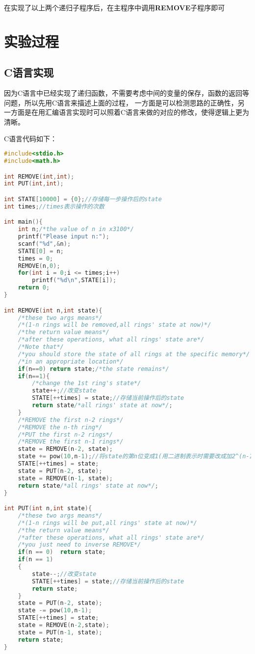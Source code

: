 \documentclass{article}
\begin{document}
在实现了以上两个递归子程序后，在主程序中调用{\bfseries REMOVE}子程序即可

\section{实验过程}

\subsection{C语言实现}

因为C语言中已经实现了递归函数，不需要考虑中间的变量的保存，函数的返回等问题，所以先用C语言来描述上面的过程，
一方面是可以检测思路的正确性，另一方面是在用汇编语言实现时可以照着C语言来做的对应的修改，使得逻辑上更为清晰。

C语言代码如下：

\begin{lstlisting}[language=C]
#include<stdio.h>
#include<math.h>

int REMOVE(int,int);
int PUT(int,int);

int STATE[10000] = {0};//存储每一步操作后的state
int times;//times表示操作的次数

int main(){
	int n;/*the value of n in x3100*/ 
	printf("Please input n:");
	scanf("%d",&n);
	STATE[0] = n;
	times = 0;
	REMOVE(n,0);
	for(int i = 0;i <= times;i++)
		printf("%d\n",STATE[i]);
	return 0;
}

int REMOVE(int n,int state){
	/*these two args means*/
	/*(1-n rings will be removed,all rings' state at now)*/
	/*the return value means*/
	/*after these operations, what all rings' state are*/
	/*Note that*/
	/*you should store the state of all rings at the specific memory*/
	/*in an appropriate location*/
	if(n==0) return state;/*the state remains*/
	if(n==1){
		/*change the 1st ring's state*/
		state++;//改变state
		STATE[++times] = state;//存储当前操作后的state
		return state/*all rings' state at now*/;
	}
	/*REMOVE the first n-2 rings*/
	/*REMOVE the n-th ring*/
	/*PUT the first n-2 rings*/
	/*REMOVE the first n-1 rings*/
	state = REMOVE(n-2, state);
	state += pow(10,n-1);//将state的第n位变成1(用二进制表示时需要改成加2^(n-1))
	STATE[++times] = state;
	state = PUT(n-2, state);
	state = REMOVE(n-1, state);
	return state/*all rings' state at now*/;
}

int PUT(int n,int state){
	/*these two args means*/
	/*(1-n rings will be put,all rings' state at now)*/
	/*the return value means*/
	/*after these operations, what all rings' state are*/
	/*you just need to inverse REMOVE*/
	if(n == 0)	return state;
	if(n == 1)
	{
		state--;//改变state
		STATE[++times] = state;//存储当前操作后的state
		return state;
	}
	state = PUT(n-2, state);
	state -= pow(10,n-1);
	STATE[++times] = state;
	state = REMOVE(n-2,state);
	state = PUT(n-1, state);
	return state;
}
\end{lstlisting}
\end{document}

